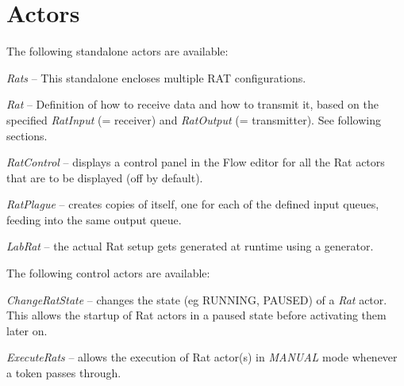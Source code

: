 \documentclass[a4paper]{book}
\begin{document}
\section{Actors}
The following standalone actors are available:
\begin{tight_itemize}
	\item \textit{Rats} -- This standalone encloses multiple RAT configurations.
	\item \textit{Rat} -- Definition of how to receive data and how to transmit 
	it, based on the specified \textit{RatInput} (= receiver) and 
	\textit{RatOutput} (= transmitter). See following sections.
	\item \textit{RatControl} -- displays a control panel in the Flow editor for
	all the Rat actors that are to be displayed (off by default).
	\item \textit{RatPlague} -- creates copies of itself, one for each of
	the defined input queues, feeding into the same output queue.
	\item \textit{LabRat} -- the actual Rat setup gets generated at runtime
	using a generator.
\end{tight_itemize}
The following control actors are available:
\begin{tight_itemize}
	\item \textit{ChangeRatState} -- changes the state (eg RUNNING, PAUSED)
	of a \textit{Rat} actor. This allows the startup of Rat actors in a
	paused state before activating them later on.
	\item \textit{ExecuteRats} -- allows the execution of Rat actor(s) in
	\textit{MANUAL} mode whenever a token passes through.
\end{tight_itemize}
\end{document}
